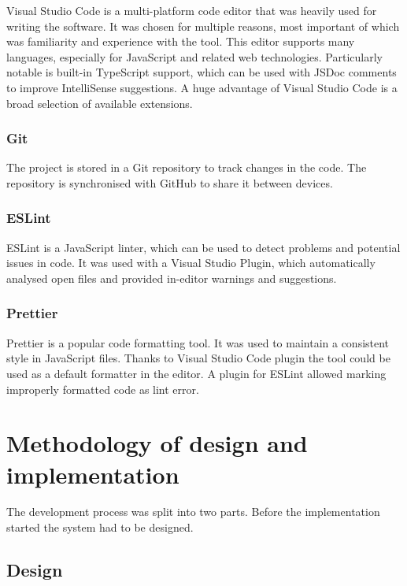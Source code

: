 Visual Studio Code is a multi-platform code editor that was heavily used for writing the software. It was chosen for multiple reasons, most important of which was familiarity and experience with the tool. This editor supports many languages, especially for JavaScript and related web technologies. Particularly notable is built-in TypeScript support, which can be used with JSDoc comments to improve IntelliSense suggestions. A huge advantage of Visual Studio Code is a broad selection of available extensions.

\subsubsection{Git}

The project is stored in a Git repository to track changes in the code. The repository is synchronised with GitHub to share it between devices.

\subsubsection{ESLint}

ESLint is a JavaScript linter, which can be used to detect problems and potential issues in code. It was used with a Visual Studio Plugin, which automatically analysed open files and provided in-editor warnings and suggestions.

\subsubsection{Prettier}

Prettier is a popular code formatting tool. It was used to maintain a consistent style in JavaScript files. Thanks to Visual Studio Code plugin the tool could be used as a default formatter in the editor. A plugin for ESLint allowed marking improperly formatted code as lint error.

\section{Methodology of design and implementation}

The development process was split into two parts. Before the implementation started the system had to be designed.

\subsection{Design}

